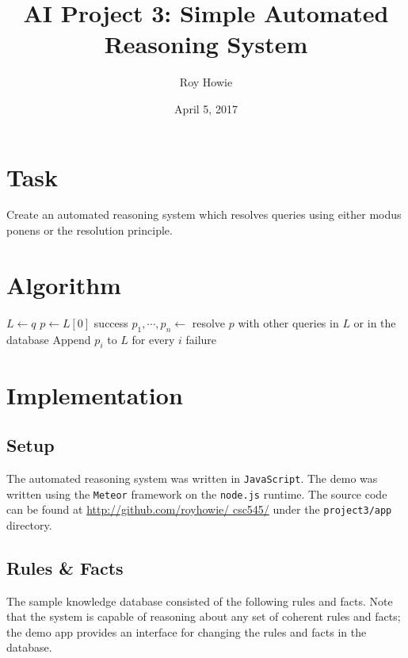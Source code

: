 \documentclass{article}
\begin{document}
\title{\vspace{-1cm}AI Project 3: Simple Automated Reasoning System}
\author{Roy Howie}
\date{April 5, 2017}
\maketitle

\section{Task}
  Create an automated reasoning system which resolves queries using either modus
  ponens or the resolution principle.

\section{Algorithm}
  \begin{algorithm}
    \begin{algorithmic}[1]
      \State $L \gets q$ 
        \State $p\gets L[0]$
          \Return success
        \EndIf
        \State $p_1,\cdots,p_n \gets$ resolve $p$ with other queries in $L$ or
          in the database
        \State Append $p_i$ to $L$ for every $i$
      \EndWhile
      \State \Return failure
    \EndProcedure
    \end{algorithmic}
  \end{algorithm}

\section{Implementation}
  \subsection{Setup}
    The automated reasoning system was written in \texttt{JavaScript}. The demo
    was written using the \texttt{Meteor} framework on the \texttt{node.js}
    runtime. The source code can be found at \url{http://github.com/royhowie/
    csc545/} under the \texttt{project3/app} directory.

  \subsection{Rules \& Facts}
    The sample knowledge database consisted of the following rules and facts.
    Note that the system is capable of reasoning about any set of coherent
    rules and facts; the demo app provides an interface for changing the rules
    and facts in the database.
\end{document}

